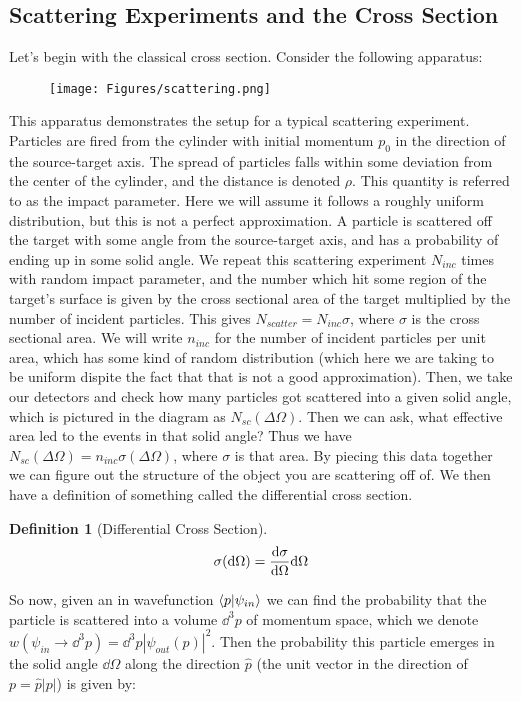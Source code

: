 \documentclass{article}
\newtheorem{defn}{Definition}
\begin{document}
\subsection{Scattering Experiments and the Cross Section}
Let's begin with the classical cross section. Consider the following apparatus:
\begin{figure}[ht]
    \centering
    \texttt{[image: Figures/scattering.png]}
    \caption*{}
    \label{fig:scattering}
\end{figure}

This apparatus demonstrates the setup for a typical scattering experiment. Particles are fired from the cylinder with initial momentum $p_0$ in the direction of the source-target axis. The spread of particles falls within some deviation from the center of the cylinder, and the distance is denoted $\rho$. This quantity is referred to as the impact parameter. Here we will assume it follows a roughly uniform distribution, but this is not a perfect approximation. A particle is scattered off the target with some angle from the source-target axis, and has a probability of ending up in some solid angle. We repeat this scattering experiment $N_{inc}$ times with random impact parameter, and the number which hit some region of the target's surface is given by the cross sectional area of the target multiplied by the number of incident particles. This gives $N_{scatter} = N_{inc} \sigma$, where $\sigma$ is the cross sectional area. We will write $n_{inc}$ for the number of incident particles per unit area, which has some kind of random distribution (which here we are taking to be uniform dispite the fact that that is not a good approximation). Then, we take our detectors and check how many particles got scattered into a given solid angle, which is pictured in the diagram as $N_{sc}(\Delta \Omega)$. Then we can ask, what effective area led to the events in that solid angle? Thus we have $N_{sc}(\Delta\Omega) = n_{inc} \sigma(\Delta\Omega)$, where $\sigma$ is that area. By piecing this data together we can figure out the structure of the object you are scattering off of. We then have a definition of something called the differential cross section.
\begin{defn}[Differential Cross Section]
\begin{equation}\sigma(\dd \Omega) = \dv{\sigma}{\Omega}\dd \Omega\end{equation}
\end{defn}
So now, given an in wavefunction $\braket{p}{\psi_{in}}$ we can find the probability that the particle is scattered into a volume $\dd^3 p$ of momentum space, which we denote $w(\psi_{in}\to \dd^3 p) = \dd^3 p |\psi_{out}(p)|^2$. Then the probability this particle emerges in the solid angle $\dd \Omega$ along the direction $\hat p$ (the unit vector in the direction of $p = \hat p |p|$) is given by:
\end{document}
